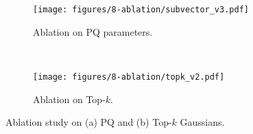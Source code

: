 \begin{figure}[t!]
    \centering
    \begin{subfigure}[t]{0.48\linewidth}
        \centering
        \texttt{[image: figures/8-ablation/subvector\_v3.pdf]}
        \label{fig:subvec}
        \vspace{-4mm}
        \caption{Ablation on PQ parameters.}
        \label{fig:ablation-a}
    \end{subfigure}%
    ~ 
    \begin{subfigure}[t]{0.48\linewidth}
        \centering
        \texttt{[image: figures/8-ablation/topk\_v2.pdf]}
        \label{fig:topk}
        \vspace{-4mm}
        \caption{Ablation on Top-$k$.}
        \label{fig:ablation-b}
    \end{subfigure}
    \vspace{-2mm}
    \caption{Ablation study on (a) PQ and (b) Top-$k$ Gaussians.}
    \label{fig:ablation}
\end{figure}
